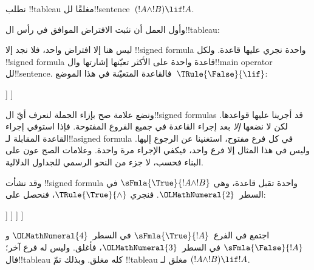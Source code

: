 \documentclass[../../../include/open-logic-section]{subfiles}
\begin{document}
      {}
      {}


\begin{ex}
نطلب !!{tableau} مغلقًا لل!!{sentence}~$(!A \land !B) \lif !A$.

وأول العمل أن نثبت الافتراض الموافق في رأس ال!!{tableau}:
\begin{oltableau}
  [\sFmla{\False}{(\formula{A} \land \formula{B}) \lif \formula{A}},
    just = \TAss]
\end{oltableau}

ليس هنا إلا افتراض واحد، فلا نجد إلا !!{signed formula} واحدة
نجري عليها قاعدة. ولكل !!{signed formula} قاعدة واحدة على الأكثر
تعيّنها إشارتها وال!!{main operator} لل!!{sentence}.
فالقاعدة المتعيّنة في هذا الموضع~$\TRule{\False}{\lif}$:
\begin{oltableau}
  [\sFmla{\False}{(\formula{A} \land \formula{B}) \lif \formula{A}},
    checked, just = \TAss
    [\sFmla{\True}{\formula{A} \land \formula{B}},
      just={\TRule{\False}{\lif}[1]}
      [\sFmla{\False}{\formula{A}}, just={\TRule{\False}{\lif}[1]}]
    ]
  ]
\end{oltableau}
ونضع علامة صح بإزاء الجملة لنعرف أيّ ال!!{signed formula}s قد
أجرينا عليها قواعدها. لكن لا نضعها \emph{إلا} بعد إجراء القاعدة
في جميع الفروع المفتوحة. فإذا استوفي إجراء القاعدة المقابلة
لـ!!a{signed formula} في كل فرع مفتوح، استغنينا عن الرجوع إليها.
وليس في هذا المثال إلا فرع واحد، فيكفي الإجراء مرة واحدة.
وعلامات الصح عون على البناء فحسب، لا جزء من النحو الرسمي للجداول
الدلالية.

وقد نشأت !!{signed formula} واحدة تقبل قاعدة، وهي
$\sFmla{\True}{!A \land !B}$ في السطر~${\OLMathNumeral{2}}$. فنجري
$\TRule{\True}{\land}$، فنحصل على:
\begin{oltableau}
  [\sFmla{\False}{(\formula{A} \land \formula{B}) \lif \formula{A}},
    checked, just = \TAss
    [\sFmla{\True}{\formula{A} \land \formula{B}},
      just={\TRule{\False}{\lif}[1]}, checked
      [\sFmla{\False}{\formula{A}}, just={\TRule{\False}{\lif}[1]}
        [\sFmla{\True}{\formula{A}}, just={\TRule{\True}{\land}[2]}
          [\sFmla{\True}{\formula{B}}, just={\TRule{\True}{\land}[2]}, close
          ]
        ]
      ]
    ]
  ]
\end{oltableau}
اجتمع في الفرع~$\sFmla{\True}{!A}$ في السطر~${\OLMathNumeral{4}}$
و$\sFmla{\False}{!A}$ في السطر~${\OLMathNumeral{3}}$، فأغلق. وليس له فرع آخر؛
فال!!{tableau} كله مغلق. وبذلك تمّ !!{tableau} مغلق لـ
$(!A \land !B) \lif !A$.
\end{ex}
\end{document}
